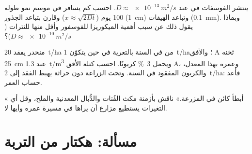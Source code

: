 \begin{exercise}[$\star\star\star$]\label{exo:b2:living-soil:10}
ينتشر الفوسفات في  عند $D \approx \qty{e-13}{m^2/s}$.
احسب كم يسافر في موسم نمو طوله \num{100} يوم
($x \approx \sqrt{2Dt}$) وقارن بتباعد الجذور
(\qty{1}{cm}) وتباعد الهيفات (\qty{0.1}{mm}). وبماذا يقول ذلك
عن سبب أهمية الميكوريزا للفوسفور وأقل منها للنترات
($D \approx \qty{e-10}{m^2/s}$)؟
\end{exercise}

\begin{exercise}[$\star\star\star$]\label{exo:b2:living-soil:11}
منحدر يفقد \qty{20}{t/ha} من  في السنة بالتعرية في حين
يتكوّن \qty{1}{t/ha}؛ والأفق A ثخنه \qty{25}{cm} عند
\qty{1.3}{t/m^3} ويحمل \qty{3}{\%} كربونًا. احسب كتلة
الأفق A، وعمره بهذا المعدل، والكربون المفقود في
السنة. وتحت الزراعة دون حراثة يهبط الفقد إلى \qty{2}{t/ha}: فأعد حساب
العمر.
\end{exercise}

\begin{exercise}[$\star\star\star$]\label{exo:b2:living-soil:12}
« أبطأ كائن في المزرعة.» ناقش بأزمنة
مكث الفُتات والدُّبال  المعدنية والملح، وقل
أي التغيرات يستطيع مزارع أن يراها في مسيرة عمره وأيها لا.
\end{exercise}

\section{مسألة: هكتار من التربة}

